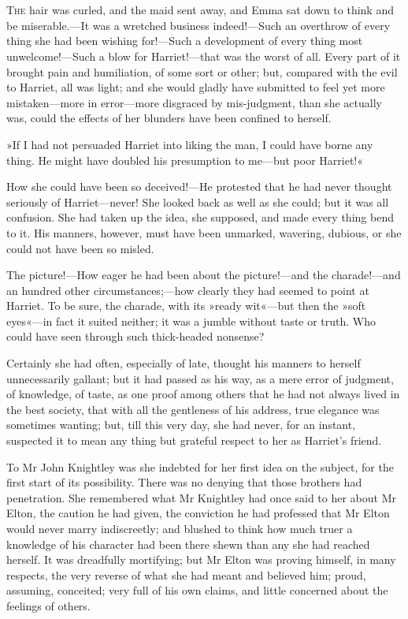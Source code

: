 \chapter[Chapter \thechapter]{}
\lettrine[lines=4,lraise=0.3]{T}{he} hair was curled, and the maid sent away, and Emma sat down to think and be miserable.—It was a wretched business indeed!—Such an overthrow of every thing she had been wishing for!—Such a development of every thing most unwelcome!—Such a blow for Harriet!—that was the worst of all. Every part of it brought pain and humiliation, of some sort or other; but, compared with the evil to Harriet, all was light; and she would gladly have submitted to feel yet more mistaken—more in error—more disgraced by mis-judgment, than she actually was, could the effects of her blunders have been confined to herself.

»If I had not persuaded Harriet into liking the man, I could have borne any thing. He might have doubled his presumption to me—but poor Harriet!«

How she could have been so deceived!—He protested that he had never thought seriously of Harriet—never! She looked back as well as she could; but it was all confusion. She had taken up the idea, she supposed, and made every thing bend to it. His manners, however, must have been unmarked, wavering, dubious, or she could not have been so misled.

The picture!—How eager he had been about the picture!—and the charade!—and an hundred other circumstances;—how clearly they had seemed to point at Harriet. To be sure, the charade, with its »ready wit«—but then the »soft eyes«—in fact it suited neither; it was a jumble without taste or truth. Who could have seen through such thick-headed nonsense?

Certainly she had often, especially of late, thought his manners to herself unnecessarily gallant; but it had passed as his way, as a mere error of judgment, of knowledge, of taste, as one proof among others that he had not always lived in the best society, that with all the gentleness of his address, true elegance was sometimes wanting; but, till this very day, she had never, for an instant, suspected it to mean any thing but grateful respect to her as Harriet's friend.

To Mr John Knightley was she indebted for her first idea on the subject, for the first start of its possibility. There was no denying that those brothers had penetration. She remembered what Mr Knightley had once said to her about Mr Elton, the caution he had given, the conviction he had professed that Mr Elton would never marry indiscreetly; and blushed to think how much truer a knowledge of his character had been there shewn than any she had reached herself. It was dreadfully mortifying; but Mr Elton was proving himself, in many respects, the very reverse of what she had meant and believed him; proud, assuming, conceited; very full of his own claims, and little concerned about the feelings of others.


